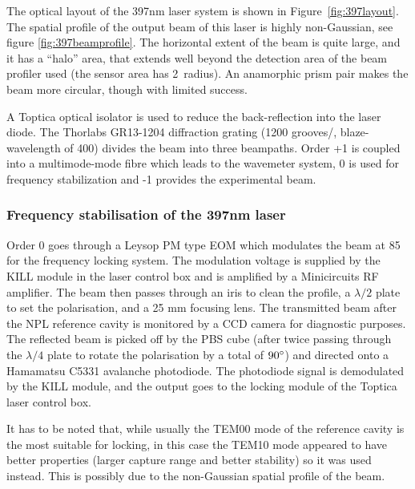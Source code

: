 The optical layout of the 397nm laser system is shown in Figure~\ref{fig:397layout}. The spatial profile of the output beam of this laser is highly non-Gaussian, see figure \ref{fig:397beamprofile}. The horizontal extent of the beam is quite large, and it has a ``halo'' area, that extends well beyond the detection area of the beam profiler used (the sensor area has 2\mm\, radius). An anamorphic prism pair makes the beam more circular, though with limited success. %

A Toptica optical isolator  is used to reduce the back-reflection into the laser diode. The Thorlabs GR13-1204 diffraction grating (1200 grooves/\mm, blaze-wavelength of 400\nm) divides the beam into three beampaths. Order +1 is coupled into a multimode-mode fibre which leads to the wavemeter system, 0 is used for frequency stabilization and -1 provides the experimental beam.

\subsubsection{Frequency stabilisation of the 397nm laser}

Order 0 goes through a Leysop PM type EOM which modulates the beam at 85\MHz\, for the frequency locking system. The modulation voltage is supplied by the KILL module in the laser control box and is amplified by a Minicircuits RF amplifier. The beam then passes through an iris to clean the profile, a $\lambda/2$ plate to set the polarisation, and a 25 mm focusing lens. The transmitted beam after the NPL reference cavity is monitored by a CCD camera for diagnostic purposes. The reflected beam is picked off by the PBS cube (after twice passing through the $\lambda/4$ plate to rotate the polarisation by a total of $90\mbox{$^{\circ}$}$) and directed onto a Hamamatsu C5331 avalanche photodiode. The photodiode signal is demodulated by the KILL module, and the output goes to the locking module of the Toptica laser control box. 


It has to be noted that, while usually the TEM00 mode of the reference cavity is the most suitable for locking, in this case the TEM10 mode appeared to have better properties (larger capture range and better stability) so it was used instead. This is possibly due to the non-Gaussian spatial profile of the beam.

